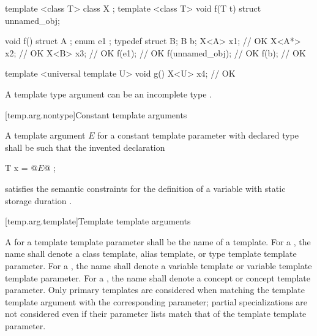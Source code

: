 \documentclass{wg21}
\begin{document}
\pnum
\begin{example}
\begin{codeblock}
    template <class T> class X { };
    template <class T> void f(T t) { }
    struct { } unnamed_obj;

    void f() {
        struct A { };
        enum { e1 };
        typedef struct { } B;
        B b;
        X<A> x1;          // OK
        X<A*> x2;         // OK
        X<B> x3;          // OK
        f(e1);            // OK
        f(unnamed_obj);   // OK
        f(b);             // OK
    }
\end{codeblock}
\begin{addedblock}
\begin{codeblock}
    template <universal template U>
    void g() {
        X<U> x4; // OK
    }
\end{codeblock}
\end{addedblock}

\end{example}
\begin{note}
    A template type argument can be an incomplete type .
\end{note}


[temp.arg.nontype]{Constant template arguments}

\pnum
A template argument $E$ for
a constant template parameter with declared type 
shall be such that the invented declaration
\begin{codeblock}
    T x = @$E$@ ;
\end{codeblock}
satisfies the semantic constraints for the definition of
a  variable with static storage duration %
.


[temp.arg.template]{Template template arguments}

\pnum
A
for a template
template parameter
shall be the name of a template.
For a ,
the name shall denote a class template, alias template, or
type template template parameter.
For a ,
the name shall denote a variable template or
variable template template parameter.
For a ,
the name shall denote a concept or
concept template parameter.
Only primary templates are considered when matching the template template
argument with the corresponding parameter; partial specializations are not
considered even if their parameter lists match that of the template template
parameter.
\end{document}
